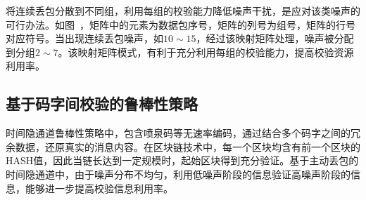 
将连续丢包分散到不同组，利用每组的校验能力降低噪声干扰，是应对该类噪声的可行办法。如图\ ，矩阵中的元素为数据包序号，矩阵的列号为组号，矩阵的行号对应符号。当出现连续丢包噪声，如$10\sim 15$，经过该映射矩阵处理，噪声被分配到分组$2\sim 7$。该映射矩阵模式，有利于充分利用每组的校验能力，提高校验资源利用率。

\subsection{基于码字间校验的鲁棒性策略}
\label{chap:hash:motivation:robustness}

时间隐通道鲁棒性策略中，包含喷泉码等无速率编码，通过结合多个码字之间的冗余数据，还原真实的消息内容。在区块链技术中，每一个区块均含有前一个区块的HASH值，因此当链长达到一定规模时，起始区块得到充分验证。基于主动丢包的时间隐通道中，由于噪声分布不均匀，利用低噪声阶段的信息验证高噪声阶段的信息，能够进一步提高校验信息利用率。


